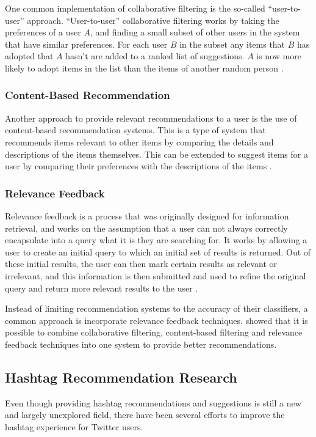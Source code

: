 \documentclass[12pt,a4paper]{article}
\begin{document}
One common implementation of collaborative filtering is the so-called ``user-to-user'' approach. ``User-to-user'' collaborative filtering works by taking the preferences of a user $A$, and finding a small subset of other users in the system that have similar preferences. For each user $B$ in the subset any items that $B$ has adopted that $A$ hasn't are added to a ranked list of suggestions. $A$ is now more likely to adopt items in the list than the items of another random person \parencite{Schafer:2001}.

\subsubsection{Content-Based Recommendation}
Another approach to provide relevant recommendations to a user is the use of content-based recommendation systems. This is a type of system that recommends items relevant to other items by comparing the details and descriptions of the items themselves. This can be extended to suggest items for a user by comparing their preferences with the descriptions of the items \parencite{Pazzani:2007}.

\subsubsection{Relevance Feedback}
Relevance feedback is a process that was originally designed for information retrieval, and works on the assumption that a user can not always correctly encapsulate into a query what it is they are searching for. It works by allowing a user to create an initial query to which an initial set of results is returned. Out of these initial results, the user can then mark certain results as relevant or irrelevant, and this information is then submitted and used to refine the original query and return more relevant results to the user \parencite{Salton:1997}.

Instead of limiting recommendation systems to the accuracy of their classifiers, a common approach is incorporate relevance feedback techniques. \textcite{Utiyama:2006} showed that it is possible to combine collaborative filtering, content-based filtering and relevance feedback techniques into one system to provide better recommendations.

\subsection{Hashtag Recommendation Research}
Even though providing hashtag recommendations and suggestions is still a new and largely unexplored field, there have been several efforts to improve the hashtag experience for Twitter users.
\end{document}
